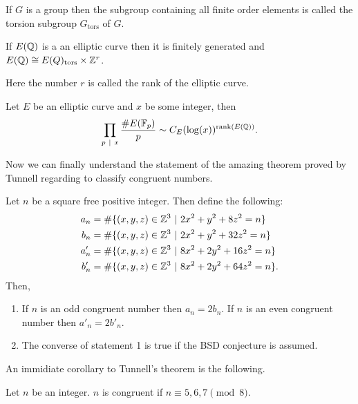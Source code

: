 \begin{definition}
  If $G$ is a group then the subgroup containing all finite order elements is called the torsion subgroup $G_{\text{tors}}$ of $G$.
\end{definition}
\begin{theorem}
  If $E(\mathbb{Q})$ is a an elliptic curve then it is finitely generated and $E(\mathbb{Q}) \cong E(Q)_{\text{tors}} \times \mathbb{Z}^r$.
\end{theorem}
Here the number $r$ is called the rank of the elliptic curve.
\begin{conjecture}
  Let $E$ be an elliptic curve and $x$ be some integer, then
  \begin{align*}
    \prod_{p\ |\ x} \frac{\# E(\mathbb{F}_p)}{p} \sim C_E (\log(x))^{\text{rank}(E(\mathbb{Q}))}.
  \end{align*}
\end{conjecture}
Now we can finally understand the statement of the amazing theorem proved by Tunnell regarding to classify congruent numbers.
\begin{theorem}[Tunnell]
  Let $n$ be a square free positive integer. Then define the following:
  \begin{align*}
    a_n &= \#\{(x,y,z)\in \mathbb{Z}^3\ |\ 2x^2 +y^2+8z^2 = n\}\\
    b_n &= \#\{(x,y,z)\in \mathbb{Z}^3\ |\ 2x^2 +y^2+32z^2 = n\}\\
    a'_n &= \#\{(x,y,z)\in \mathbb{Z}^3\ |\ 8x^2 +2y^2+16z^2 = n\}\\
    b'_n &= \#\{(x,y,z)\in \mathbb{Z}^3\ |\ 8x^2 +2y^2+64z^2 = n\}.
  \end{align*}
  Then,
  \begin{enumerate}
    \item If $n$ is an odd congruent number then $a_n = 2b_n$. If $n$ is an even congruent number then $a'_n = 2b'_n$.
    \item The converse of statement 1 is true if the BSD conjecture is assumed.
  \end{enumerate}
\end{theorem}

An immidiate corollary to Tunnell's theorem is the following.
\begin{corollary}
  Let $n$ be an integer. $n$ is congruent if $n \equiv 5,6,7 \pmod{8}$.
\end{corollary}
